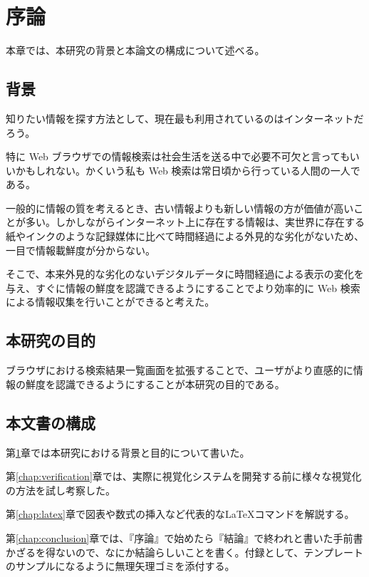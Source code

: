 \chapter{序論}
\label{chap:introduction}

本章では、本研究の背景と本論文の構成について述べる。

\section{背景}

知りたい情報を探す方法として、現在最も利用されているのはインターネットだろう。

特に Web ブラウザでの情報検索は社会生活を送る中で必要不可欠と言ってもいいかもしれない。かくいう私も Web 検索は常日頃から行っている人間の一人である。

一般的に情報の質を考えるとき、古い情報よりも新しい情報の方が価値が高いことが多い。しかしながらインターネット上に存在する情報は、実世界に存在する紙やインクのような記録媒体に比べて時間経過による外見的な劣化がないため、一目で情報載鮮度が分からない。

そこで、本来外見的な劣化のないデジタルデータに時間経過による表示の変化を与え、すぐに情報の鮮度を認識できるようにすることでより効率的に Web 検索による情報収集を行いことができると考えた。

\section{本研究の目的}

ブラウザにおける検索結果一覧画面を拡張することで、ユーザがより直感的に情報の鮮度を認識できるようにすることが本研究の目的である。

\section{本文書の構成}

第\ref{chap:introduction}章では本研究における背景と目的について書いた。

第\ref{chap:verification}章では、実際に視覚化システムを開発する前に様々な視覚化の方法を試し考察した。

第\ref{chap:latex}章で図表や数式の挿入など代表的な\LaTeX コマンドを解説する。

第\ref{chap:conclusion}章では、『序論』で始めたら『結論』で終われと書いた手前書かざるを得ないので、なにか結論らしいことを書く。付録として、テンプレートのサンプルになるように無理矢理ゴミを添付する。
